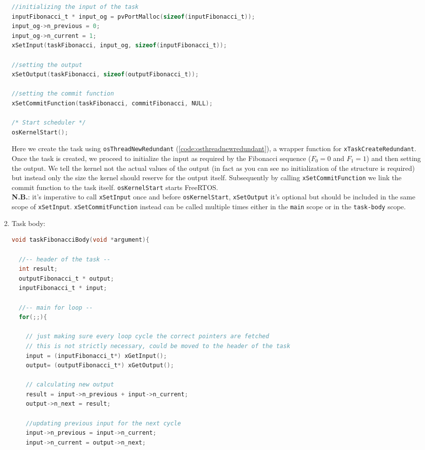 \documentclass[a4paper, 12pt]{article}
\begin{document}
\begin{onehalfspace}
\begin{enumerate}
{\begin{lstlisting}[language=C]
//initializing the input of the task
inputFibonacci_t * input_og = pvPortMalloc(sizeof(inputFibonacci_t));
input_og->n_previous = 0;
input_og->n_current = 1;
xSetInput(taskFibonacci, input_og, sizeof(inputFibonacci_t));

//setting the output
xSetOutput(taskFibonacci, sizeof(outputFibonacci_t));

//setting the commit function
xSetCommitFunction(taskFibonacci, commitFibonacci, NULL);

/* Start scheduler */
osKernelStart();
        \end{lstlisting}
        Here we create the task using \texttt{osThreadNewRedundant} (\ref{code:osthreadnewredundant}), a wrapper function for \texttt{xTaskCreateRedundant}.
        Once the task is created, we proceed to initialize the input as required by the Fibonacci sequence ($F_0 = 0$ and $F_1 = 1$) and then setting the output.
        We tell the kernel not the actual values of the output (in fact as you can see no initialization of the structure is required) but instead only the size the kernel should reserve for the output itself. Subsequently by calling \texttt{xSetCommitFunction} we link the commit function to the task itself.
        \texttt{osKernelStart} starts FreeRTOS.\\
        \textbf{N.B.}: it's imperative to call \texttt{xSetInput} once and before \texttt{osKernelStart}, \texttt{xSetOutput} it's optional but should be included in the same scope of \texttt{xSetInput}. \texttt{xSetCommitFunction} instead can be called multiple times either in the \texttt{main} scope or in the \texttt{task-body} scope.
    }
    \item {
    Task body:
    \begin{lstlisting}[language=C]
void taskFibonacciBody(void *argument){

  //-- header of the task --
  int result;
  outputFibonacci_t * output;
  inputFibonacci_t * input;

  //-- main for loop --
  for(;;){

    // just making sure every loop cycle the correct pointers are fetched
    // this is not strictly necessary, could be moved to the header of the task
    input = (inputFibonacci_t*) xGetInput();
    output= (outputFibonacci_t*) xGetOutput();

    // calculating new output
    result = input->n_previous + input->n_current;
    output->n_next = result;

    //updating previous input for the next cycle
    input->n_previous = input->n_current;
    input->n_current = output->n_next;


\end{lstlisting}}
\end{enumerate}
\end{onehalfspace}
\end{document}
